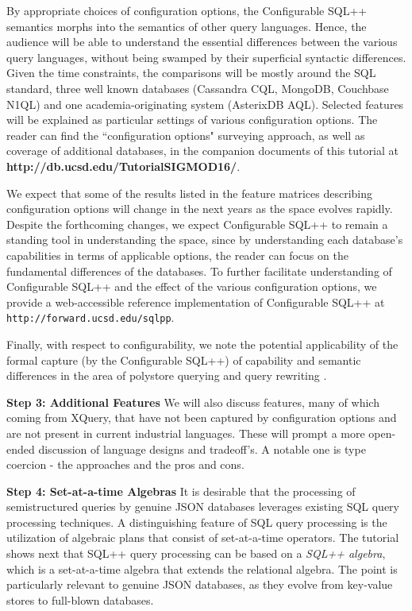 By appropriate choices of configuration options, the Configurable SQL++ semantics morphs into the semantics of other query languages. Hence, the audience will be able to understand the essential differences between the various query languages, without being swamped by their superficial syntactic differences. Given the time constraints, the comparisons will be mostly around the SQL standard, three well known databases (Cassandra CQL, MongoDB, Couchbase N1QL) and one academia-originating system (AsterixDB AQL). Selected features will be explained as particular settings of various configuration options. The reader can find the ``configuration options" surveying approach, as well as coverage of additional databases, in the companion documents of this tutorial at \textbf{http://db.ucsd.edu/TutorialSIGMOD16/}.  

We expect that some of the results listed in the feature matrices describing configuration options will change in the next years as the space evolves rapidly.
Despite the forthcoming changes, we expect Configurable SQL++ to remain a standing tool in understanding the space, since by understanding each database's capabilities in terms of applicable options, the reader can focus on the fundamental differences of the databases. To further facilitate understanding of Configurable SQL++ and the effect of the various configuration options, we provide a web-accessible reference implementation of Configurable SQL++ at \texttt{http://forward.ucsd.edu/sqlpp}.

Finally, with respect to configurability, we note the potential applicability of the formal capture (by the Configurable SQL++) of capability and semantic differences in the area of polystore querying and query rewriting \cite{DugganESBHKMMMZ15}.

\noindent \textbf{Step 3: Additional Features} We will also discuss features, many of which coming from XQuery, that have not been captured by configuration options and are not present in current industrial languages.  These will prompt a more open-ended discussion of language designs and tradeoff's. A notable one is type coercion - the approaches and the pros and cons.

\noindent \textbf{Step 4: Set-at-a-time Algebras}
It is desirable that the processing of semistructured queries by genuine JSON databases leverages existing SQL query processing techniques. A distinguishing feature of SQL query processing is the utilization of algebraic plans that consist of set-at-a-time operators. The tutorial shows next that SQL++ query processing can be based on a {\em SQL++ algebra}, which is a set-at-a-time algebra that extends the relational algebra. The point is particularly relevant to genuine JSON databases, as they evolve from key-value stores to full-blown databases.

